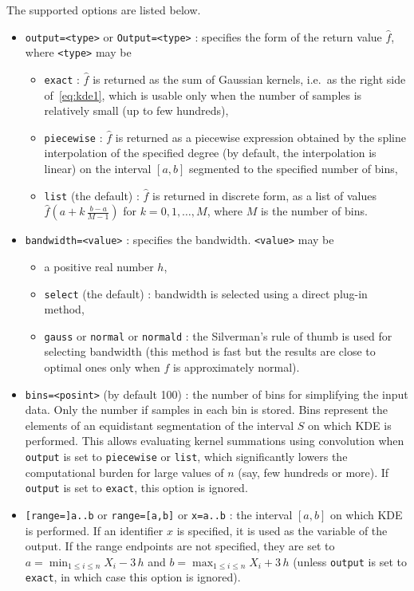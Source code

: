 \documentclass[a4paper,11pt]{book}
\begin{document}
The supported options are listed below.
\begin{itemize}
  \item {\tt output=<type>} or {\tt Output=<type>} : specifies the form of the return value $\hat{f}$, where {\tt <type>} may be
  \begin{itemize}
    \item {\tt exact} : $\hat{f}$ is returned as the sum of Gaussian kernels, i.e.~as the right side of~\eqref{eq:kde1}, which is usable only when the number of samples is relatively small (up to few hundreds),
    \item {\tt piecewise} : $\hat{f}$ is returned as a piecewise expression obtained by the spline interpolation of the specified degree (by default, the interpolation is linear) on the interval $[a,b]$ segmented to the specified number of bins,
    \item {\tt list} (the default) : $\hat{f}$ is returned in discrete form, as a list of values $\hat{f}\left(a+k\,\frac{b-a}{M-1}\right)$ for $k=0,1,\dots,M$, where $M$ is the number of bins.
  \end{itemize}
  \item {\tt bandwidth=<value>} : specifies the bandwidth. {\tt <value>} may be
  \begin{itemize}
    \item a positive real number $h$,
    \item {\tt select} (the default) : bandwidth is selected using a direct plug-in method,
    \item {\tt gauss} or {\tt normal} or {\tt normald} : the Silverman's rule of thumb is used for selecting bandwidth (this method is fast but the results are close to optimal ones only when $f$ is approximately normal).
  \end{itemize}
  \item {\tt bins=<posint>} (by default 100) : the number of bins for simplifying the input data. Only the number if samples in each bin is stored. Bins represent the elements of an equidistant segmentation of the interval $S$ on which KDE is performed. This allows evaluating kernel summations using convolution when {\tt output} is set to {\tt piecewise} or {\tt list}, which significantly lowers the computational burden for large values of $n$ (say, few hundreds or more). If {\tt output} is set to {\tt exact}, this option is ignored.
  \item {\tt [range=]a..b} or {\tt range=[a,b]} or {\tt x=a..b} : the interval $[a,b]$ on which KDE is performed. If an identifier $x$ is specified, it is used as the variable of the output. If the range endpoints are not specified, they are set to $a=\min_{1\leq i\leq n} X_i-3\,h$ and $b=\max_{1\leq i\leq n}X_i+3\,h$ (unless {\tt output} is set to {\tt exact}, in which case this option is ignored).

\end{itemize}
\end{document}
